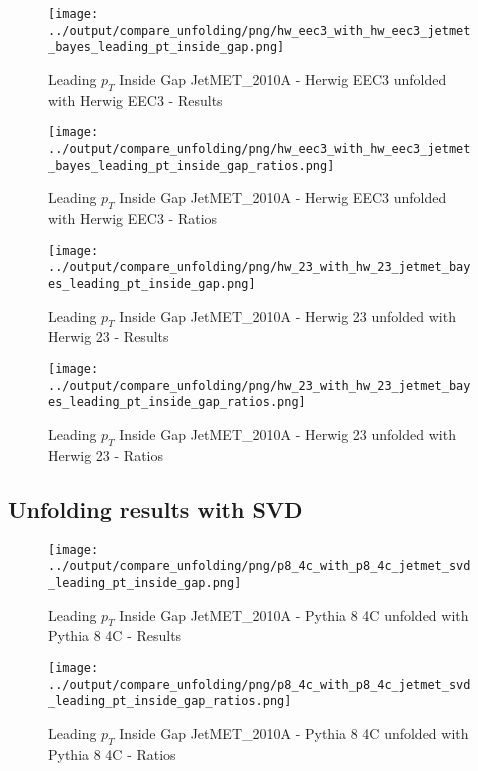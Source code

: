 \documentclass[11pt]{book}
\begin{document}
\begin{figure}[ht]
\centering
\texttt{[image: ../output/compare\_unfolding/png/hw\_eec3\_with\_hw\_eec3\_jetmet\_bayes\_leading\_pt\_inside\_gap.png]}
\caption{Leading $p_{T}$ Inside Gap JetMET\_2010A - Herwig EEC3 unfolded with Herwig EEC3 - Results}
\label{hw_eec3_hw_eec3_jetmet_bayes_leading_pt_inside_gap_a}
\end{figure}

\begin{figure}[ht]
\centering
\texttt{[image: ../output/compare\_unfolding/png/hw\_eec3\_with\_hw\_eec3\_jetmet\_bayes\_leading\_pt\_inside\_gap\_ratios.png]}
\caption{Leading $p_{T}$ Inside Gap JetMET\_2010A - Herwig EEC3 unfolded with Herwig EEC3 - Ratios}
\label{hw_eec3_hw_eec3_jetmet_bayes_leading_pt_inside_gap_b}
\end{figure}

\begin{figure}[ht]
\centering
\texttt{[image: ../output/compare\_unfolding/png/hw\_23\_with\_hw\_23\_jetmet\_bayes\_leading\_pt\_inside\_gap.png]}
\caption{Leading $p_{T}$ Inside Gap JetMET\_2010A - Herwig 23 unfolded with Herwig 23 - Results}
\label{hw_23_hw_23_jetmet_bayes_leading_pt_inside_gap_a}
\end{figure}

\begin{figure}[ht]
\centering
\texttt{[image: ../output/compare\_unfolding/png/hw\_23\_with\_hw\_23\_jetmet\_bayes\_leading\_pt\_inside\_gap\_ratios.png]}
\caption{Leading $p_{T}$ Inside Gap JetMET\_2010A - Herwig 23 unfolded with Herwig 23 - Ratios}
\label{hw_23_hw_23_jetmet_bayes_leading_pt_inside_gap_b}
\end{figure}


\clearpage
\subsection{Unfolding results with SVD}

\begin{figure}[ht]
\centering
\texttt{[image: ../output/compare\_unfolding/png/p8\_4c\_with\_p8\_4c\_jetmet\_svd\_leading\_pt\_inside\_gap.png]}
\caption{Leading $p_{T}$ Inside Gap JetMET\_2010A - Pythia 8 4C unfolded with Pythia 8 4C - Results}
\label{p8_p8_jetmet_svd_leading_pt_inside_gap_a}
\end{figure}

\begin{figure}[ht]
\centering
\texttt{[image: ../output/compare\_unfolding/png/p8\_4c\_with\_p8\_4c\_jetmet\_svd\_leading\_pt\_inside\_gap\_ratios.png]}
\caption{Leading $p_{T}$ Inside Gap JetMET\_2010A - Pythia 8 4C unfolded with Pythia 8 4C - Ratios}
\label{p8_p8_jetmet_svd_leading_pt_inside_gap_b}
\end{figure}
\end{document}
